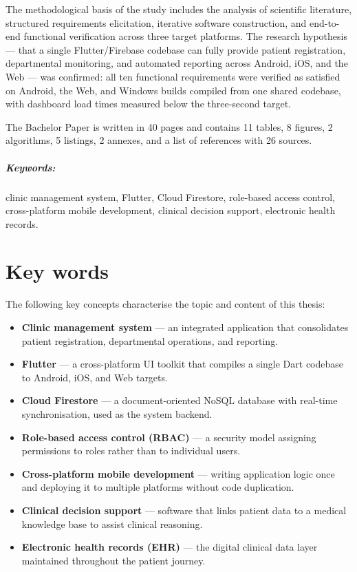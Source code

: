 \documentclass[12pt,a4paper,oneside]{report}
\begin{document}
The methodological basis of the study includes the analysis of scientific
literature, structured requirements elicitation, iterative software
construction, and end-to-end functional verification across three target
platforms. The research hypothesis --- that a single Flutter/Firebase codebase
can fully provide patient registration, departmental monitoring, and automated
reporting across Android, iOS, and the Web --- was confirmed: all ten
functional requirements were verified as satisfied on Android, the Web, and
Windows builds compiled from one shared codebase, with dashboard load times
measured below the three-second target.

The Bachelor Paper is written in 40 pages and contains 11 tables, 8 figures,
2 algorithms, 5 listings, 2 annexes, and a list of references with 26 sources.

\paragraph{Keywords:} clinic management system, Flutter, Cloud Firestore,
role-based access control, cross-platform mobile development, clinical decision
support, electronic health records.

\chapter*{Key words}

The following key concepts characterise the topic and content of this thesis:

\begin{itemize}
  \item \textbf{Clinic management system} --- an integrated application that
        consolidates patient registration, departmental operations, and
        reporting.
  \item \textbf{Flutter} --- a cross-platform UI toolkit that compiles a single
        Dart codebase to Android, iOS, and Web targets.
  \item \textbf{Cloud Firestore} --- a document-oriented NoSQL database with
        real-time synchronisation, used as the system backend.
  \item \textbf{Role-based access control (RBAC)} --- a security model assigning
        permissions to roles rather than to individual users.
  \item \textbf{Cross-platform mobile development} --- writing application logic
        once and deploying it to multiple platforms without code duplication.
  \item \textbf{Clinical decision support} --- software that links patient data
        to a medical knowledge base to assist clinical reasoning.
  \item \textbf{Electronic health records (EHR)} --- the digital clinical data
        layer maintained throughout the patient journey.
\end{itemize}
\end{document}
